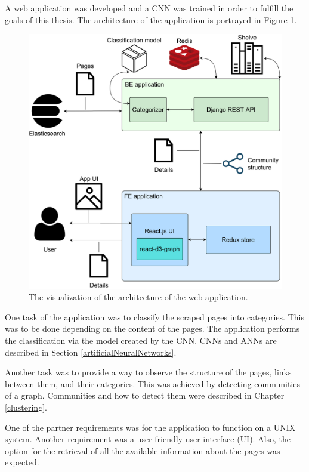 \label{developmentIntroduction}
A web application was developed and a CNN was trained in order to fulfill the goals of this thesis. The architecture of the application is portrayed in Figure \ref{ApplicationArchitecture}. 

\begin{figure}[ht!]
  \centering
  \includegraphics[width = \textwidth]{Images/ApplicationArchitecture.png}
  \caption{The visualization of the architecture of the web application.}
  \label{ApplicationArchitecture}
\end{figure}

One task of the application was to classify the scraped pages into categories. This was to be done depending on the content of the pages. The application performs the classification via the model created by the CNN. CNNs and ANNs are described in Section \ref{artificialNeuralNetworks}. 

Another task was to provide a way to observe the structure of the pages, links between them, and their categories. This was achieved by detecting communities of a graph. Communities and how to detect them were described in Chapter \ref{clustering}. 

One of the partner requirements was for the application to function on a UNIX system. Another requirement was a user friendly user interface (UI). Also, the option for the retrieval of all the available information about the pages was expected. 

